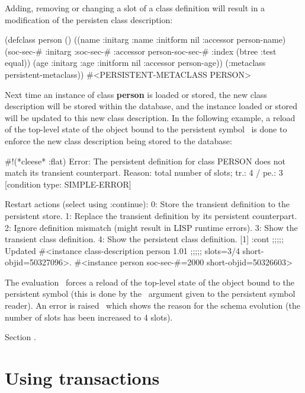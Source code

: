 Adding, removing or changing a slot of a class definition will result
in a modification of the persisten class description:
\begin{CompactCode}
\listener{}(defclass person ()
              ((name :initarg :name :initform nil :accessor person-name)
               (soc-sec-# :initarg :soc-sec-#
                          :accessor person-soc-sec-#
                          :index (btree :test equal))
               (age :initarg :age :initform nil :accessor person-age))
              (:metaclass persistent-metaclass))
#<PERSISTENT-METACLASS PERSON>
\end{CompactCode}

Next time an instance of class \textbf{person} is loaded or stored,
the new class description will be stored within the database, and the
instance loaded or stored will be updated to this new class
description. In the following example, a reload of the top-level
state of the object bound to the persistent symbol \ is
done to enforce the new class description being stored to the
database:
\begin{CompactCode}
\listener{}#!(*cleese* :flat)\marginnumber{\smalloi}
Error: The persistent definition for class
PERSON does not match its transient counterpart.
       Reason: total number of slots; tr.: 4 / pe.: 3\marginnumber{\smalloii}
  [condition type: SIMPLE-ERROR]

Restart actions (select using :continue):
 0: Store the transient definition to the persistent store.
 1: Replace the transient definition by its persistent counterpart.
 2: Ignore definition mismatch (might result in LISP runtime errors).
 3: Show the transient class definition.
 4: Show the persistent class definition.
[1] \listener{}:cont
;;;;; Updated #<instance class-description person 1.01
;;;;;                    slots=3/4 short-objid=50327096>.
#<instance person soc-sec-#=2000 short-objid=50326603>
\end{CompactCode}

The evaluation \oi\ forces a reload of the top-level state of the
object bound to the persistent symbol (this is done by the
\ argument given to the persistent symbol reader). An error
is raised \oii\ which shows the reason for the schema evolution
(the number of slots has been increased to 4 slots).

 Section .

\section{Using transactions}

